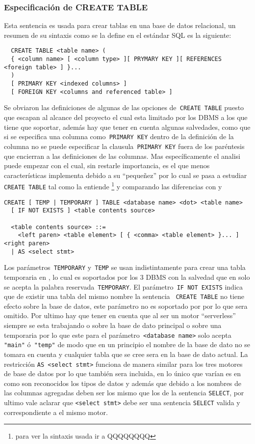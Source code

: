\subsubsection{Especificación de CREATE TABLE} 
\label{especificacion:dialectos:create}
Esta sentencia es usada para crear tablas en una base de datos relacional, un resumen de su sintaxis como se la define en el estándar SQL es la siguiente:
\begin{Verbatim}
  CREATE TABLE <table name> (
  { <column name> [ <column type> ][ PRYMARY KEY ][ REFERENCES <foreign table> ] }...
  )
  [ PRIMARY KEY <indexed columns> ]
  [ FOREIGN KEY <columns and referenced table> ]
\end{Verbatim}
%
Se obviaron las definiciones de algunas de las opciones de\verb= CREATE TABLE= puesto que escapan al alcance del proyecto el cual esta limitado por los DBMS a los que tiene que soportar, además hay que tener en cuenta algunas salvedades, como que si se especifica una columna como\verb= PRIMARY KEY= dentro de la definición de la columna no se puede especificar la clausula\verb= PRIMARY KEY= fuera de los paréntesis que encierran a las definiciones de las columnas. Mas específicamente el analisi puede empezar con \s el cual, sin restarle importancia, es el que menos características implementa debido a su ``pequeñez'' por lo cual se pasa a estudiar\verb= CREATE TABLE= tal como la entiende \s\cite{sqlite:sql}\footnote{para ver la sintaxis usada ir a QQQQQQQQ} y comparando las diferencias con \m\citep{mysql:sql} y \p\citep{postgre:sql}
%
\begin{Verbatim}[frame=leftline, framesep=3mm]
  CREATE [ TEMP | TEMPORARY ] TABLE <database name> <dot> <table name> 
  [ IF NOT EXISTS ] <table contents source>

  <table contents source> ::=
    <left paren> <table element> [ { <comma> <table element> }... ] <right paren>
  | AS <select stmt>
\end{Verbatim}
%
Los parámetros\verb= TEMPORARY= y\verb= TEMP= se usan indistintamente para crear una tabla temporaria en \s, lo cual es soportados por los 3 DBMS con la salvedad que en \m solo se acepta la palabra reservada\verb= TEMPORARY=. El parámetro\verb= IF NOT EXISTS= indica que de existir una tabla del mismo nombre la sentencia \verb= CREATE TABLE= no tiene efecto sobre la base de datos, este parámetro no es soportado por \p por lo que sera omitido. Por ultimo hay que tener en cuenta que al ser \s un motor ``serverless'' siempre se esta trabajando o sobre la base de dato principal o sobre una temporaria por lo que este para el parámetro\verb= <database name>= solo acepta\verb= "main"= ó\verb= "temp"= de modo que en un principio el nombre de la base de dato no se tomara en cuenta y cualquier tabla que se cree sera en la base de dato actual.  La restricción \verb=AS <select stmt>= funciona de manera similar para los tres motores de base de datos por lo que también sera incluida, en lo único que varían es en como son reconocidos los tipos de datos y además que debido a \s los nombres de las columnas agregadas deben ser los mismo que los de la sentencia \verb=SELECT=, por ultimo vale aclarar que \verb=<select stmt>= debe ser una sentencia \verb=SELECT= valida y correspondiente a el mismo motor.
